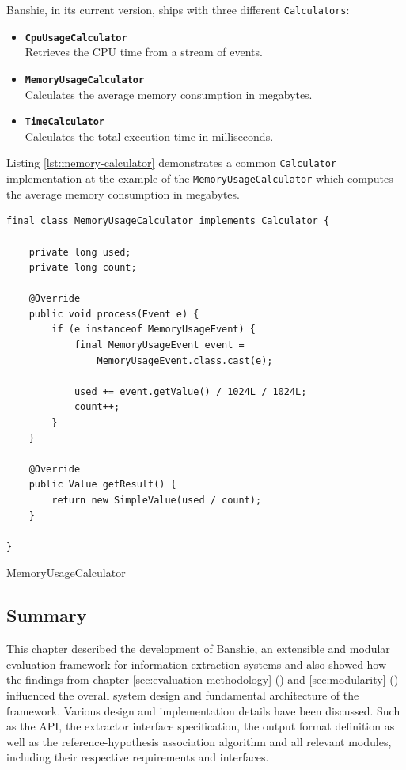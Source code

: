 Banshie, in its current version, ships with three different \texttt{Calculators}:

\begin{itemize}
	\item \textbf{\texttt{CpuUsageCalculator}} \\
		Retrieves the CPU time from a stream of events.
	\item \textbf{\texttt{MemoryUsageCalculator}} \\
		Calculates the average memory consumption in megabytes.
	\item \textbf{\texttt{TimeCalculator}} \\
		Calculates the total execution time in milliseconds.
\end{itemize}

\newpage
Listing \ref{lst:memory-calculator} demonstrates a common \texttt{Calculator} implementation at the example of the \texttt{MemoryUsageCalculator} which computes the average memory consumption in megabytes.

\begin{listing}[H]
\begin{verbatim}
final class MemoryUsageCalculator implements Calculator {

    private long used;
    private long count;

    @Override
    public void process(Event e) {
        if (e instanceof MemoryUsageEvent) {
            final MemoryUsageEvent event = 
                MemoryUsageEvent.class.cast(e);

            used += event.getValue() / 1024L / 1024L;
            count++;
        }
    }

    @Override
    public Value getResult() {
        return new SimpleValue(used / count);
    }

}
\end{verbatim}
\caption{MemoryUsageCalculator}
\label{lst:memory-calculator}
\end{listing}

\subsection{Summary}
This chapter described the development of Banshie, an extensible and modular evaluation framework for information extraction systems and also showed how the findings from chapter \ref{sec:evaluation-methodology} () and \ref{sec:modularity} () influenced the overall system design and fundamental architecture of the framework. Various design and implementation details have been discussed. Such as the API, the extractor interface specification, the output format definition as well as the reference-hypothesis association algorithm and all relevant modules, including their respective requirements and interfaces.

